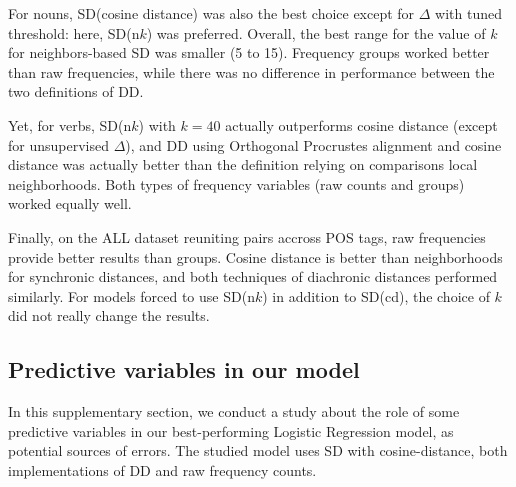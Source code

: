 \documentclass[11pt]{article}
\begin{document}
For nouns, SD(cosine distance) was also the best choice except for $\Delta$ with tuned threshold: here, SD(n$k$) was preferred. Overall, the best range for the value of $k$ for neighbors-based SD was smaller (5 to 15). Frequency groups worked better than raw frequencies, while there was no difference in performance between the two definitions of DD.

Yet, for verbs, SD(n$k$) with $k=40$ actually outperforms cosine distance (except for unsupervised $\Delta$), and DD using Orthogonal Procrustes alignment and cosine distance \citep{hamilton-etal-2016-diachronic} was actually better than the definition relying on comparisons local neighborhoods. Both types of frequency variables (raw counts and groups) worked equally well. 

Finally, on the ALL dataset reuniting pairs accross POS tags, raw frequencies provide better results than groups. Cosine distance is better than neighborhoods for synchronic distances, and both techniques of diachronic distances performed similarly. For models forced to use SD(n$k$) in addition to SD(cd), the choice of $k$ did not really change the results.


\subsection{Predictive variables in our model}

In this supplementary section, we conduct a study about the role of some predictive variables in our best-performing Logistic Regression model, as potential sources of errors. The studied model uses SD with cosine-distance, both implementations of DD and raw frequency counts.

\label{analysisPred}
\end{document}
